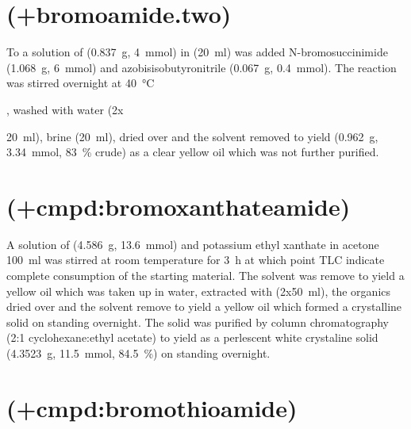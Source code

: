 {%

\section{ (\cmpd+{bromoamide.two})}
To a solution of  (\SI{0.837}{\gram}, \SI{4}{\milli\mol}) in  (\SI{20}{\milli\litre}) was added N-bromosuccinimide (\SI{1.068}{\gram}, \SI{6}{\milli\mol}) and azobisisobutyronitrile (\SI{0.067}{\gram}, \SI{0.4}{\milli\mol}). The reaction was stirred overnight at \SI{40}{\celsius}}, washed with water (2x{\SI{20}{\milli\litre}), brine (\SI{20}{\milli\litre}), dried over  and the solvent removed \invacuo to yield  (\SI{0.962}{\gram}, \SI{3.34}{\milli\mol}, \SI{83}{\percent} crude) as a clear yellow oil which was not further purified.


\section{ (\cmpd+{cmpd:bromoxanthateamide})}

A solution of  (\SI{4.586}{\gram}, \SI{13.6}{\milli\mol}) and potassium ethyl xanthate in acetone {\SI{100}{\milli\litre}} was  stirred at room temperature for \SI{3}{\hour} at which point TLC indicate complete consumption of the starting material. The solvent was remove \invacuo to yield a yellow oil which was taken up in water, extracted with  (2x\SI{50}{\milli\litre}), the organics dried over  and the solvent remove to yield a yellow oil which formed a crystalline solid on standing overnight. The solid was purified by column chromatography (2:1 cyclohexane:ethyl acetate) to yield  as a perlescent white crystaline solid (\SI{4.3523}{\gram}, \SI{11.5}{\milli\mol}, \SI{84.5}{\percent}) on standing overnight.


\section{ (\cmpd+{cmpd:bromothioamide})}

}
